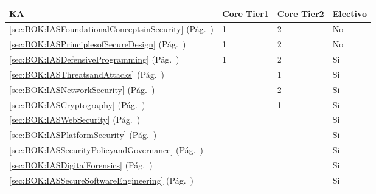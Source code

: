 \begin{center}
\begin{tabularx}{\textwidth}{|X|p{1cm}|p{1cm}|p{1.4cm}|}\hline
\textbf{\acf{KA}} & \textbf{Core Tier1} & \textbf{Core Tier2} & \textbf{Electivo} \\ \hline
\ref{sec:BOK:IASFoundationalConceptsinSecurity} \htmlref{\IASFoundationalConceptsinSecurity}{sec:BOK:IASFoundationalConceptsinSecurity}\xspace (Pág.~\pageref{sec:BOK:IASFoundationalConceptsinSecurity}) & 1 & 2 & No \\ \hline
\ref{sec:BOK:IASPrinciplesofSecureDesign} \htmlref{\IASPrinciplesofSecureDesign}{sec:BOK:IASPrinciplesofSecureDesign}\xspace (Pág.~\pageref{sec:BOK:IASPrinciplesofSecureDesign}) & 1 & 2 & No \\ \hline
\ref{sec:BOK:IASDefensiveProgramming} \htmlref{\IASDefensiveProgramming}{sec:BOK:IASDefensiveProgramming}\xspace (Pág.~\pageref{sec:BOK:IASDefensiveProgramming}) & 1 & 2 & Si \\ \hline
\ref{sec:BOK:IASThreatsandAttacks} \htmlref{\IASThreatsandAttacks}{sec:BOK:IASThreatsandAttacks}\xspace (Pág.~\pageref{sec:BOK:IASThreatsandAttacks}) & ~ & 1 & Si \\ \hline
\ref{sec:BOK:IASNetworkSecurity} \htmlref{\IASNetworkSecurity}{sec:BOK:IASNetworkSecurity}\xspace (Pág.~\pageref{sec:BOK:IASNetworkSecurity}) & ~ & 2 & Si \\ \hline
\ref{sec:BOK:IASCryptography} \htmlref{\IASCryptography}{sec:BOK:IASCryptography}\xspace (Pág.~\pageref{sec:BOK:IASCryptography}) & ~ & 1 & Si \\ \hline
\ref{sec:BOK:IASWebSecurity} \htmlref{\IASWebSecurity}{sec:BOK:IASWebSecurity}\xspace (Pág.~\pageref{sec:BOK:IASWebSecurity}) & ~ & ~ & Si \\ \hline
\ref{sec:BOK:IASPlatformSecurity} \htmlref{\IASPlatformSecurity}{sec:BOK:IASPlatformSecurity}\xspace (Pág.~\pageref{sec:BOK:IASPlatformSecurity}) & ~ & ~ & Si \\ \hline
\ref{sec:BOK:IASSecurityPolicyandGovernance} \htmlref{\IASSecurityPolicyandGovernance}{sec:BOK:IASSecurityPolicyandGovernance}\xspace (Pág.~\pageref{sec:BOK:IASSecurityPolicyandGovernance}) & ~ & ~ & Si \\ \hline
\ref{sec:BOK:IASDigitalForensics} \htmlref{\IASDigitalForensics}{sec:BOK:IASDigitalForensics}\xspace (Pág.~\pageref{sec:BOK:IASDigitalForensics}) & ~ & ~ & Si \\ \hline
\ref{sec:BOK:IASSecureSoftwareEngineering} \htmlref{\IASSecureSoftwareEngineering}{sec:BOK:IASSecureSoftwareEngineering}\xspace (Pág.~\pageref{sec:BOK:IASSecureSoftwareEngineering}) & ~ & ~ & Si \\ \hline
\end{tabularx}
\end{center}
